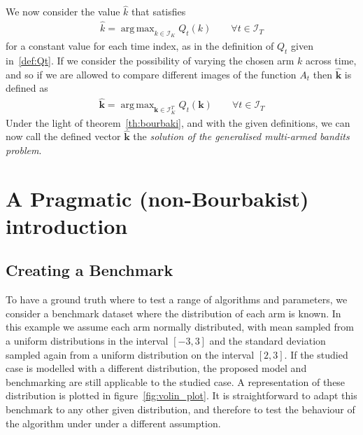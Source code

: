 \documentclass[]{scrartcl}
\DeclareMathOperator*{\argmax}{arg\,max}
\theoremstyle{definition}
\begin{document}
We now consider the value $\hat{k}$ that satisfies
\begin{align*}
\hat{k} = \argmax_{k \in \mathcal{I}_K} Q_t(k)
\qquad
\forall t \in \mathcal{I}_T
\end{align*}
for a constant value for each time index, as in the definition of $Q_t$ given in~\ref{def:Qt}. 
If we consider the possibility of varying the chosen arm $k$ across time, and so if we are allowed to compare different images of the function $A_t$ then $\hat{\mathbf{k}}$ is defined as
\begin{align}\label{eq:bourbaki_solution}
\hat{\mathbf{k}} 
= 
\argmax_{\mathbf{k} \in \mathcal{I}_K^{T}} Q_t(\mathbf{k})
\qquad
\forall t \in \mathcal{I}_T
\end{align}
Under the light of theorem~\ref{th:bourbaki}, and with the given definitions, we can now call the defined vector $\hat{\mathbf{k}}$ the \emph{solution of the generalised multi-armed bandits problem}.

\section{A Pragmatic (non-Bourbakist) introduction}
\label{se:pragmatic_perspective}

\subsection*{Creating a Benchmark}

To have a ground truth where to test a range of algorithms and parameters, we consider a benchmark dataset where the distribution of each arm is known.
In this example we assume each arm normally distributed, with mean sampled from a uniform distributions in the interval $[-3, 3]$ and the standard deviation sampled again from a uniform distribution on the interval $[2, 3]$. If the studied case is modelled with a different distribution, the proposed model and benchmarking are still applicable to the studied case. A representation of these distribution is plotted in 
figure~\ref{fig:volin_plot}.
It is straightforward to adapt this benchmark to any other given distribution, and therefore to test the behaviour of the algorithm under under a different assumption.
\end{document}
